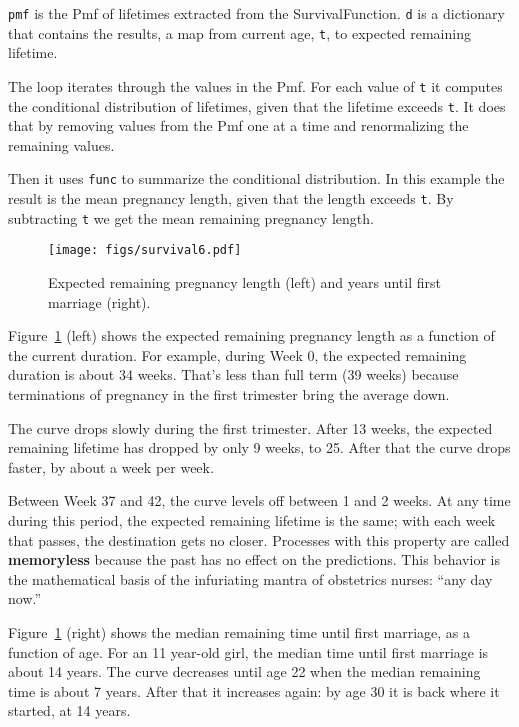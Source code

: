 \documentclass[12pt]{book}
\begin{document}
{\tt pmf} is the Pmf of lifetimes extracted from the SurvivalFunction.
{\tt d} is a dictionary that contains the results, a map from
current age, {\tt t}, to expected remaining lifetime.

The loop iterates through the values in the Pmf.  For each value
of {\tt t} it computes the conditional distribution of lifetimes,
given that the lifetime exceeds {\tt t}.  It does that by removing
values from the Pmf one at a time and renormalizing the remaining
values.

Then it uses {\tt func} to summarize the conditional distribution.
In this example the result is the mean pregnancy length, given that
the length exceeds {\tt t}.  By subtracting {\tt t} we get the
mean remaining pregnancy length.

\begin{figure}
\centerline{\texttt{[image: figs/survival6.pdf]}}
\caption{Expected remaining pregnancy length (left) and
years until first marriage (right).}
\label{survival6}
\end{figure}

Figure~\ref{survival6} (left) shows the expected remaining pregnancy
length as a function of the current duration.  For example, during
Week 0, the expected remaining duration is about 34 weeks.  That's
less than full term (39 weeks) because terminations of pregnancy
in the first trimester bring the average down.

The curve drops slowly during the first trimester.  After 13 weeks,
the expected remaining lifetime has dropped by only 9 weeks, to
25.  After that the curve drops faster, by about a week per week.

Between Week 37 and 42, the curve levels off between 1 and 2 weeks.
At any time during this period, the expected remaining lifetime is the
same; with each week that passes, the destination gets no closer.
Processes with this property are called {\bf memoryless} because
the past has no effect on the predictions.
This behavior is the mathematical basis of the infuriating mantra
of obstetrics nurses: ``any day now.''

Figure~\ref{survival6} (right) shows the median remaining time until
first marriage, as a function of age.  For an 11 year-old girl, the
median time until first marriage is about 14 years.  The curve decreases
until age 22 when the median remaining time is about 7 years.
After that it increases again: by age 30 it is back where it started,
at 14 years.
\end{document}
